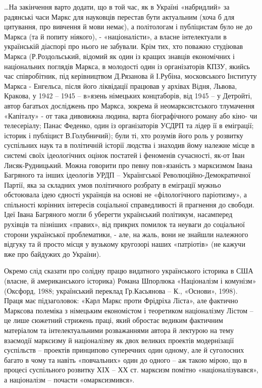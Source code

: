 \documentclass{kapital}
\begin{document}
	  …На закінчення варто додати, що в той час, як в Україні «набридлий» за радянські часи Маркс для науковців перестав бути актуальним (хоча б для цитування, про вивчення й мови немає), а політологам і публіцистам було не до Маркса (та й попиту ніякого), - «націоналісти», а власне інтелектуали в українській діаспорі  про нього не забували. Крім тих, хто поважно студіював Маркса (Р.Роздольський, відомий як один із кращих знавців економічних і національних поглядів Маркса, в молодості один із організаторів КПЗУ, якийсь час співробітник, під керівництвом Д.Рязанова й І.Рубіна, московського Інституту Маркса - Енгельса, після його ліквідації працював у архівах Відня, Львова, Кракова, у 1942 – 1945 – в»язень німецьких концтаборів, від 1945 – у Детройті, автор багатьох досліджень про Маркса, зокрема й неомарксистського тлумачення «Капіталу» - от  така дивовижна людина, варта біографічного роману або кіно- чи телесеріалу; Панас Феденко, один із організаторів  УСДРП та лідер її в еміграції; історик і публіцист В.Голубничий); були ті, хто розумів його роль у розвитку  суспільних наук та в політичній історії людства і знаходив йому належне місце в системі своїх ідеологічних оцінок постатей і феноменів сучасності, як-от Іван Лисяк-Рудницький. Можна говорити про певну пов»язаність з марксизмом Івана Багряного та інших ідеологів УРДП – Українгської Революційно-Демократичної Партії, яка за складних умов політичного розбрату в еміграції мужньо обстоювала ідею єдності українців на основі не «філологічного     паріотизму», а спільності корінних інтересів соціальної справедливості  й прагнення до свободи. Ідеї Івана Багряного могли б уберегти український політикум, насамперед рухівців та пізніших «правих», від прикрих помилок та неуваги до соціальної сторони української проблематики, - але, на жаль, вони не знайшли належного відгуку та й просто місця у вузькому кругозорі наших «патріотів» (не кажучи вже про  байдужих до України).    
 
	Окремо слід сказати про солідну працю видатного українського історика в США (власне, й американського історика) Романа Шпорлюка  «Націоналізм і комунізм» (Оксфорд, 1988; український переклад Гр.Касьянова – К., «Основи», 1998). Праця має підзаголовок: «Карл Маркс проти Фрідріха Ліста», але фактично Марксова полеміка з німецьким економістом і теоретиком націоналізму Лістом – це лише сюжетний стрижень праці, який обростає ведиким фактичним матеріалом та інтелектуальними розважаннями автора й лектурою на тему взаємодії марксизму й націоналізму як двох великих проектів модернізації суспільств – проектів принципово суперечних один одному, але й суголосних багато в чому та навіть «повчальних» один до одного – аж такою мірою, що в процесі суспільного розвитку ХIХ – ХХ ст. марксизм помітно «націоналізувався», а націоналізм – почасти «омарксизмився».
 
\end{document}
